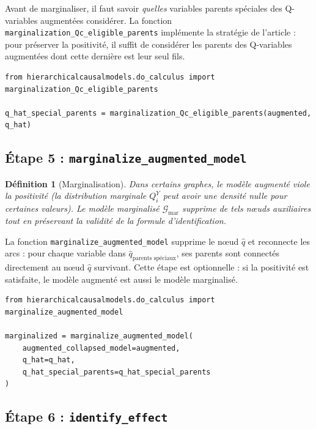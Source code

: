 \documentclass[11pt,a4paper]{article}
\newcommand{\mar}{\mathrm{mar}}
\newtheorem{definition}{Définition}
\begin{document}
Avant de marginaliser, il faut savoir \emph{quelles} variables parents spéciales des Q-variables augmentées considérer.
La fonction \texttt{marginalization\_Qc\_eligible\_parents} implémente la stratégie de l'article : pour préserver la positivité, il suffit de considérer les parents des Q-variables augmentées dont cette dernière est leur seul fils.

\begin{lstlisting}[caption={Suggestion de parents elligibles pour la marginalisation}]
from hierarchicalcausalmodels.do_calculus import marginalization_Qc_eligible_parents

q_hat_special_parents = marginalization_Qc_eligible_parents(augmented, q_hat)
\end{lstlisting}

\subsection{Étape 5 : \texttt{marginalize\_augmented\_model}}

\begin{definition}[Marginalisation]
Dans certains graphes, le modèle augmenté viole la positivité (la distribution marginale $Q^Y_i$ peut avoir une densité nulle pour certaines valeurs).
Le modèle marginalisé $\mathcal{G}_\mar$ supprime de tels nœuds auxiliaires tout en préservant la validité de la formule d'identification.
\end{definition}

La fonction \texttt{marginalize\_augmented\_model} supprime le nœud $\hat{q}$ et reconnecte les arcs :
pour chaque variable dans $\hat{q}_{\text{parents spéciaux}}$, ses parents sont connectés directement au nœud $\hat{q}$ survivant.
Cette étape est optionnelle : si la positivité est satisfaite, le modèle augmenté est aussi le modèle marginalisé.

\begin{lstlisting}[caption={Marginalisation}]
from hierarchicalcausalmodels.do_calculus import marginalize_augmented_model

marginalized = marginalize_augmented_model(
    augmented_collapsed_model=augmented,
    q_hat=q_hat,
    q_hat_special_parents=q_hat_special_parents
)
\end{lstlisting}

\subsection{Étape 6 : \texttt{identify\_effect}}
\end{document}
